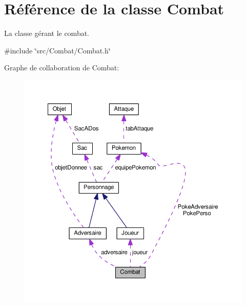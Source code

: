 \hypertarget{class_combat}{}\section{Référence de la classe Combat}
\label{class_combat}


La classe gérant le combat.  




{\ttfamily \#include \char`\"{}src/\+Combat/\+Combat.\+h\char`\"{}}



Graphe de collaboration de Combat\+:\nopagebreak
\begin{figure}[H]
\begin{center}
\leavevmode
\includegraphics[width=350pt]{class_combat__coll__graph}
\end{center}
\end{figure}
